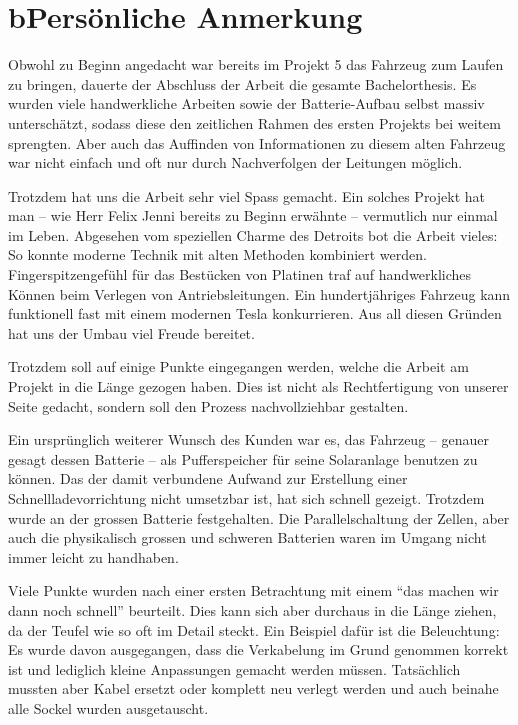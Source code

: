 \chapter*{b\quad Persönliche Anmerkung}
Obwohl zu Beginn angedacht war bereits im Projekt 5 das Fahrzeug zum Laufen zu bringen, dauerte der Abschluss der Arbeit die gesamte Bachelorthesis. Es wurden viele handwerkliche Arbeiten sowie der Batterie-Aufbau selbst massiv unterschätzt, sodass diese den zeitlichen Rahmen des ersten Projekts bei weitem sprengten. Aber auch das Auffinden von Informationen zu diesem alten Fahrzeug war nicht einfach und oft nur durch Nachverfolgen der Leitungen möglich.

Trotzdem hat uns die Arbeit sehr viel Spass gemacht. Ein solches Projekt hat man -- wie Herr Felix Jenni bereits zu Beginn erwähnte -- vermutlich nur einmal im Leben. Abgesehen vom speziellen Charme des Detroits bot die Arbeit vieles: So konnte moderne Technik mit alten Methoden kombiniert werden. Fingerspitzengefühl für das Bestücken von Platinen traf auf handwerkliches Können beim Verlegen von Antriebsleitungen. Ein hundertjähriges Fahrzeug kann funktionell fast mit einem modernen Tesla konkurrieren. Aus all diesen Gründen hat uns der Umbau viel Freude bereitet.

Trotzdem soll auf einige Punkte eingegangen werden, welche die Arbeit am Projekt in die Länge gezogen haben. Dies ist nicht als Rechtfertigung von unserer Seite gedacht, sondern soll den Prozess nachvollziehbar gestalten.

Ein ursprünglich weiterer Wunsch des Kunden war es, das Fahrzeug -- genauer gesagt dessen Batterie -- als Pufferspeicher für seine Solaranlage benutzen zu können. Das der damit verbundene Aufwand zur Erstellung einer Schnellladevorrichtung nicht umsetzbar ist, hat sich schnell gezeigt. Trotzdem wurde an der grossen Batterie festgehalten. Die Parallelschaltung der Zellen, aber auch die physikalisch grossen und schweren Batterien waren im Umgang nicht immer leicht zu handhaben.

Viele Punkte wurden nach einer ersten Betrachtung mit einem "`das machen wir dann noch schnell"' beurteilt. Dies kann sich aber durchaus in die Länge ziehen, da der Teufel wie so oft im Detail steckt. Ein Beispiel dafür ist die Beleuchtung: Es wurde davon ausgegangen, dass die Verkabelung im Grund genommen korrekt ist und lediglich kleine Anpassungen gemacht werden müssen. Tatsächlich mussten aber Kabel ersetzt oder komplett neu verlegt werden und auch beinahe alle Sockel wurden ausgetauscht.

